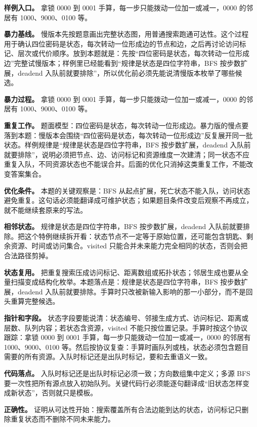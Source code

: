 \textbf{样例入口。} 拿锁 0000 到 0001 手算，每一步只能拨动一位加一或减一，0000 的邻居有 1000、9000、0100 等。

\textbf{暴力基线。} 慢版本先按题意画出完整状态图，用普通搜索跑通可达性。这个过程用于确认四位密码是状态，每次转动一位形成边的节点和边，之后再讨论访问标记、层次或代价顺序。放到本题就是：先按“四位密码是状态，每次转动一位形成边”完整试慢版本；样例里已经能看到“规律是状态是四位字符串，BFS 按步数扩展，deadend 入队前就要排除”，所以优化前必须先能说清慢版本枚举了哪些候选。

\textbf{暴力过程。} 拿锁 0000 到 0001 手算，每一步只能拨动一位加一或减一，0000 的邻居有 1000、9000、0100 等。

\textbf{重复工作。} 题面模型：四位密码是状态，每次转动一位形成边。暴力版的慢点要落到本题：慢版本会围绕“四位密码是状态，每次转动一位形成边”反复展开同一批状态。样例规律是“规律是状态是四位字符串，BFS 按步数扩展，deadend 入队前就要排除”，说明必须把节点、边、访问标记和资源维度一次建清；同一状态不应重复入队，不同资源状态也不能误合并。后面的优化只消掉这类重复工作，不能改变答案集合。

\textbf{优化条件。} 本题的关键观察是：BFS 从起点扩展，死亡状态不能入队，访问状态避免重复。这句话必须能翻译成可维护状态；如果题目条件改变后观察不再成立，就不能继续套原来的写法。

\textbf{相邻状态。} 规律是状态是四位字符串，BFS 按步数扩展，deadend 入队前就要排除。把这个特例继续拆开看：状态节点不一定等于原始位置，还可能包含钥匙、剩余资源、时间或访问集合。visited 只能合并未来能力完全相同的状态，否则会把合法路径剪掉。

\textbf{状态复用。} 把重复搜索压成访问标记、距离数组或拓扑状态；邻居生成也要从全量扫描变成结构化枚举。本题落点是：规律是状态是四位字符串，BFS 按步数扩展，deadend 入队前就要排除。手算时只改被新输入影响的那一小部分，而不是回头重算完整候选。

\textbf{指针和字段。} 状态字段要能说清：状态编号、邻接生成方式、访问标记、距离或层数、队列内容；若状态含资源，visited 不能只按位置记录。手算时按这个协议跟踪：拿锁 0000 到 0001 手算，每一步只能拨动一位加一或减一，0000 的邻居有 1000、9000、0100 等。然后按协议复查：手算时画队列或栈，状态必须包含题目需要的所有资源。入队时标记还是出队时标记，要和去重语义一致。

\textbf{代码落点。} 入队时标记还是出队时标记必须一致；方向数组集中定义；多源 BFS 要一次性把所有源点放入初始队列。关键代码行必须能逐句翻译成“旧状态怎样变成新状态”，否则就只是模板。

\textbf{正确性。} 证明从可达性开始：搜索覆盖所有合法边能到达的状态，访问标记只删除重复状态而不删除不同未来能力。

